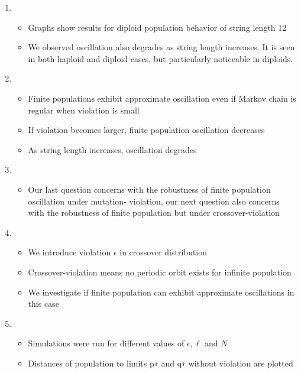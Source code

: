 \documentclass{article}
\begin{document}
\begin{enumerate}
\begin{itemize}
  \end{itemize}
  
\item
  \begin{itemize}
  \item Graphs show results for diploid population behavior of string length 12
  \item We observed oscillation also degrades as string length increases. 
  It is seen in both haploid and diploid cases, but particularly noticeable in diploids.  
  \end{itemize}
  
\item
  \begin{itemize}
  \item Finite populations exhibit approximate oscillation even if Markov chain is regular when violation is small
  \item If violation becomes larger, finite population oscillation decreases
  \item As string length increases, oscillation degrades
  \end{itemize}
  
\item
  \begin{itemize}
  \item Our last question concerns with the robustness of finite population oscillation under mutation- violation, 
  our next question also concerns with the robustness of finite population but under crossover-violation  
  \end{itemize}

\item
  \begin{itemize}
  \item We introduce violation $\epsilon$ in crossover distribution
  \item Crossover-violation means no periodic orbit exists for infinite population
  \item We investigate if finite population can exhibit approximate oscillations in this case     
  \end{itemize}
  
\item
  \begin{itemize}
  \item Simulations were run for different values of $\epsilon, \ell$ and $N$
  \item Distances of population to limits p∗ and q∗ without violation are plotted  
  \end{itemize}
  

\end{enumerate}
\end{document}
